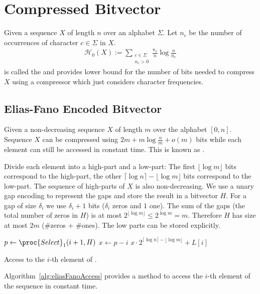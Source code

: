 \section{Compressed Bitvector}

\begin{Definition}
  \label{def:zerothOrderEntropy}
  Given a sequence $X$ of length $n$ over an alphabet $\Sigma$. Let $n_c$ be the number of occurrences of character $c \in \Sigma$ in $X$.
  \begin{align}
    \mathcal{H}_0(X) := \sum\limits_{\substack{c \in \Sigma\\ n_c > 0}} \frac{n_c}{n}\log\frac{n}{n_c}
  \end{align}
  is called the  and provides lower bound for the number of bits needed to compress $X$ using a compressor which just considers character frequencies.
\end{Definition}

\subsection{Elias-Fano Encoded Bitvector}

\begin{Theorem}
  \label{thm:eliasFanoEncoding}
  Given a non-decreasing sequence $X$ of length $m$ over the alphabet $[0,n]$. Sequence $X$ can be compressed using $2m + m\log\frac{n}{m} + o(m)$ bits while each element can still be accessed in constant time. This is known as .
\end{Theorem}

\begin{Proof}
  Divide each element into a high-part and a low-part: The first $\lfloor \log m \rfloor$ bits correspond to the high-part, the other $\lceil \log n \rceil - \lfloor \log m \rfloor$ bits correspond to the low-part. The sequence of high-parts of $X$ is also non-decreasing. We use a unary gap encoding to represent the gaps and store the result in a bitvector $H$. For a gap of size $\delta_i$ we use $\delta_i + 1$ bits ($\delta_i$ zeros and $1$ one). The sum of the gaps (the total number of zeros in $H$) is at most $2^{\lfloor \log m \rfloor} \leq 2^{\log m} = m$. Therefore $H$ has size at most $2m$ (\#zeros + \#ones). The low parts can be stored explicitly.

  \begin{algorithm}[htb]
    \begin{codebox}
      \li $p \gets \proc{Select}_1(i + 1, H)$
      \li $x \gets p - i$
      \li \Return  $x \cdot 2^{\lceil\log n\rceil - \lfloor\log m\rfloor} + L[i]$
    \end{codebox}
    \caption{Access to the $i$-th element of .}
    \label{alg:eliasFanoAccess}
  \end{algorithm}

  Algorithm~\ref{alg:eliasFanoAccess} provides a method to access the $i$-th element of the sequence in constant time.
\end{Proof}

